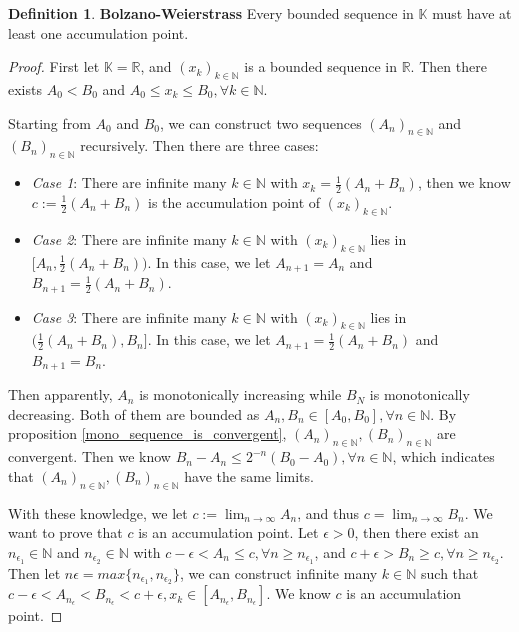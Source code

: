 \documentclass{article}
\theoremstyle{definition}
\newtheorem{defi}{Definition}[subsection]
\begin{document}
\begin{defi}
\textbf{Bolzano-Weierstrass} Every bounded sequence in $\mathbb{K}$ must have at least one accumulation point.
\begin{proof}
First let $\mathbb{K}=\mathbb{R}$, and $(x_k)_{k\in\mathbb{N}}$ is a bounded sequence in $\mathbb{R}$. Then there exists $A_0<B_0$ and $A_0\leq x_k\leq B_0, \forall k \in\mathbb{N}$.

Starting from $A_0$ and $B_0$, we can construct two sequences $(A_n)_{n\in\mathbb{N}}$ and $(B_n)_{n\in\mathbb{N}}$ recursively. Then there are three cases:
\begin{itemize}
    \item \textit{Case 1}: There are infinite many $k\in\mathbb{N}$ with $x_k = \frac{1}{2}(A_n+B_n)$, then we know $c := \frac{1}{2}(A_n+B_n)$ is the accumulation point of $(x_k)_{k\in\mathbb{N}}$.
    \item \textit{Case 2}: There are infinite many $k\in\mathbb{N}$ with $(x_k)_{k\in\mathbb{N}}$ lies in $[A_n, \frac{1}{2}(A_n+B_n))$. In this case, we let $A_{n+1}=A_{n}$ and $B_{n+1}=\frac{1}{2}(A_n+B_n)$.
    \item \textit{Case 3}: There are infinite many $k\in\mathbb{N}$ with $(x_k)_{k\in\mathbb{N}}$ lies in $(\frac{1}{2}(A_n+B_n), B_n]$. In this case, we let $A_{n+1}=\frac{1}{2}(A_n+B_n)$ and $B_{n+1}=B_n$.
\end{itemize}
Then apparently, $A_n$ is monotonically increasing while $B_N$ is monotonically decreasing. Both of them are bounded as $A_n, B_n \in [A_0, B_0], \forall n\in\mathbb{N}$. By proposition \ref{mono_sequence_is_convergent}, $(A_n)_{n\in\mathbb{N}},(B_n)_{n\in\mathbb{N}}$ are convergent. Then we know $B_n-A_n\leq 2^{-n}(B_0-A_0), \forall n\in\mathbb{N}$, which indicates that $(A_n)_{n\in\mathbb{N}}, (B_n)_{n\in\mathbb{N}}$ have the same limits.

With these knowledge, we let $c:=\lim_{n\to\infty}A_{n}$, and thus $c=\lim_{n\to\infty}B_{n}$. We want to prove that $c$ is an accumulation point. Let $\epsilon>0$, then there exist an $n_{\epsilon_{1}}\in\mathbb{N}$ and $n_{\epsilon_{2}}\in\mathbb{N}$ with $c-\epsilon<A_n\leq c, \forall n\geq n_{\epsilon_{1}}$, and $c+\epsilon>B_n\geq c, \forall n\geq n_{\epsilon_{2}}$. Then let $n\epsilon=max\{n_{\epsilon_{1}}, n_{\epsilon_{2}}\}$, we can construct infinite many $k\in\mathbb{N}$ such that $c-\epsilon<A_{n_{\epsilon}}<B_{n_{\epsilon}}<c+\epsilon, x_k\in[A_{n_{\epsilon}}, B_{n_{\epsilon}}]$. We know $c$ is an accumulation point.


\end{proof}
\end{defi}
\end{document}

